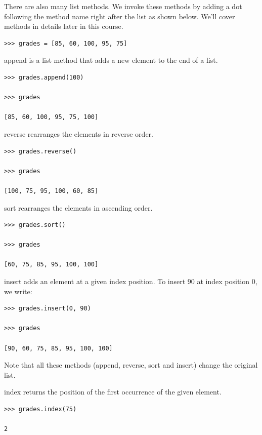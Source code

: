 \documentclass{article}
\begin{document}
There are also many list methods.  We invoke these methods by adding a dot following the method name right after the list as shown below.  We'll cover methods in details later in this course.

\begin{lstlisting}
>>> grades = [85, 60, 100, 95, 75]

\end{lstlisting}

append is a list method that adds a new element to the end of a list.

\begin{lstlisting}
>>> grades.append(100)

>>> grades

[85, 60, 100, 95, 75, 100]

\end{lstlisting}

reverse rearranges the elements in reverse order.

\begin{lstlisting}
>>> grades.reverse()

>>> grades

[100, 75, 95, 100, 60, 85]

\end{lstlisting}

sort rearranges the elements in ascending order.

\begin{lstlisting}
>>> grades.sort()

>>> grades

[60, 75, 85, 95, 100, 100]

\end{lstlisting}

insert  adds an element at a given index position.  To insert 90 at index position 0, we write:

\begin{lstlisting}
>>> grades.insert(0, 90)

>>> grades

[90, 60, 75, 85, 95, 100, 100]

\end{lstlisting}

Note that all these methods (append, reverse, sort and insert) change the original list.

index returns the position of the first occurrence of the given element. 

\begin{lstlisting}
>>> grades.index(75)

2
\end{lstlisting}
\end{document}
